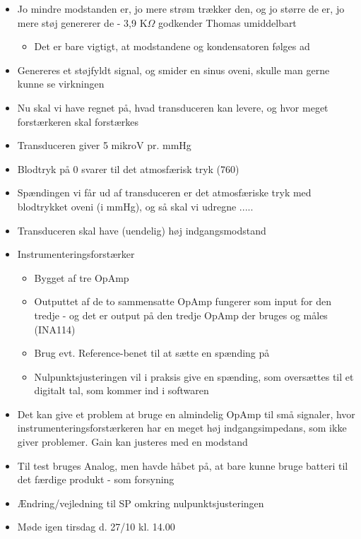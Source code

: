 \documentclass[a4paper,11pt,oneside]{memoir}
\begin{document}
\begin{itemize}
\item Jo mindre modstanden er, jo mere strøm trækker den, og jo større de er, jo mere støj genererer de - 3,9 K$\Omega$ godkender Thomas umiddelbart
\begin{itemize}
\item Det er bare vigtigt, at modstandene og kondensatoren følges ad
\end{itemize}
\item Genereres et støjfyldt signal, og smider en sinus oveni, skulle man gerne kunne se virkningen 
\item Nu skal vi have regnet på, hvad transduceren kan levere, og hvor meget forstærkeren skal forstærkes
\item Transduceren giver 5 mikroV pr. mmHg
\item Blodtryk på 0 svarer til det atmosfærisk tryk (760)  
\item Spændingen vi får ud af transduceren er det atmosfæriske tryk med blodtrykket oveni (i mmHg), og så skal vi udregne .....
\item Transduceren skal have (uendelig) høj indgangsmodstand
\item Instrumenteringsforstærker
\begin{itemize}
\item Bygget af tre OpAmp
\item Outputtet af de to sammensatte OpAmp fungerer som input for den tredje - og det er output på den tredje OpAmp der bruges og måles (INA114)
\item Brug evt. Reference-benet til at sætte en spænding på 
\item Nulpunktsjusteringen vil i praksis give en spænding, som oversættes til et digitalt tal, som kommer ind i softwaren 
\end{itemize}
\item Det kan give et problem at bruge en almindelig OpAmp til små signaler, hvor instrumenteringsforstærkeren har en meget høj indgangsimpedans, som ikke giver problemer. Gain kan justeres med en modstand
\item Til test bruges Analog, men havde håbet på, at bare kunne bruge batteri til det færdige produkt - som forsyning
\item Ændring/vejledning til SP omkring nulpunktsjusteringen 
\item Møde igen tirsdag d. 27/10 kl. 14.00
\end{itemize}


\newpage

\end{document}
